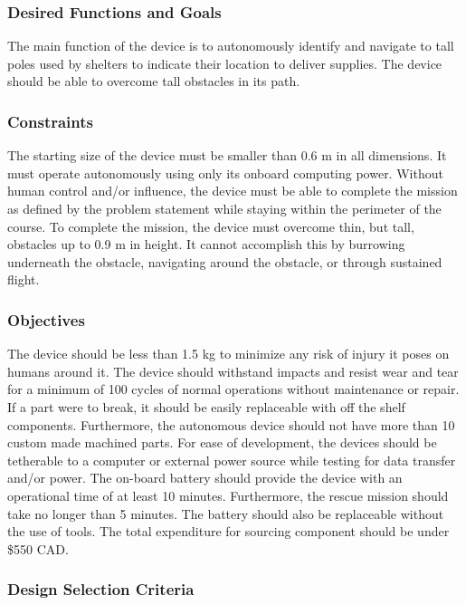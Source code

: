 \documentclass[ece]{uw-wkrpt}
\begin{document}
\subsubsection{Desired Functions and Goals}

The main function of the device is to autonomously identify and navigate to tall poles used by shelters to indicate their location to deliver supplies. The device should be able to overcome tall obstacles in its path.

\subsubsection{Constraints}

The starting size of the device must be smaller than 0.6 m in all dimensions. It must operate autonomously using only its onboard computing power. Without human control and/or influence, the device must be able to complete the mission as defined by the problem statement while staying within the perimeter of the course. To complete the mission, the device must overcome thin, but tall, obstacles up to 0.9 m in height. It cannot accomplish this by burrowing underneath the obstacle, navigating around the obstacle, or through sustained flight.

\subsubsection{Objectives}

The device should be less than 1.5 kg to minimize any risk of injury it poses on humans around it. The device should withstand impacts and resist wear and tear for a minimum of 100 cycles of normal operations without maintenance or repair. If a part were to break, it should be easily replaceable with off the shelf components. Furthermore, the autonomous device should not have more than 10 custom made machined parts. For ease of development, the devices should be tetherable to a computer or external power source while testing for data transfer and/or power. The on-board battery should provide the device with an operational time of at least 10 minutes. Furthermore, the rescue mission should take no longer than 5 minutes. The battery should also be replaceable without the use of tools. The total expenditure for sourcing component should be under \$550 CAD. 

\subsubsection{Design Selection Criteria}
\end{document}
